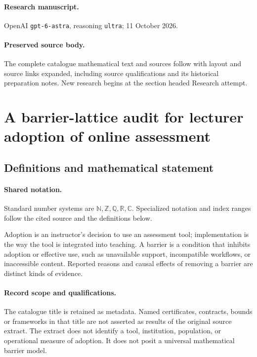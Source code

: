\documentclass[11pt]{article}
\begin{document}
\paragraph{Research manuscript.} OpenAI \texttt{gpt-6-astra}, reasoning \texttt{ultra}; 11 October 2026.
\paragraph{Preserved source body.} The complete catalogue mathematical text and sources follow with layout and source links expanded, including source qualifications and its historical preparation notes. New research begins at the section headed Research attempt.

\section{A barrier-lattice audit for lecturer adoption of online assessment}\label{statement}

\subsection{Definitions and mathematical statement}

\paragraph{Shared notation.}Standard number systems are $\mathbb N,\mathbb Z,\mathbb Q,\mathbb R,\mathbb C$. Specialized notation and index ranges follow the cited source and the definitions below.


Adoption is an instructor's decision to use an assessment tool; implementation is the way the tool is integrated into teaching. A barrier is a condition that inhibits adoption or effective use, such as unavailable support, incompatible workflows, or inaccessible content. Reported reasons and causal effects of removing a barrier are distinct kinds of evidence.
\paragraph{Record scope and qualifications.}
The catalogue title is retained as metadata. Named certificates, contracts, bounds or frameworks in that title are not asserted as results of the original source extract.
The extract does not identify a tool, institution, population, or operational measure of adoption. It does not posit a universal mathematical barrier model.
\end{document}
